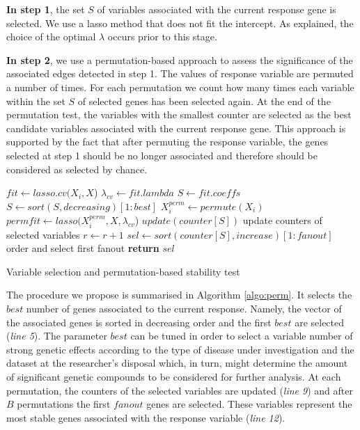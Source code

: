 \textbf{In step 1}, the set $S$ of variables associated with the current response gene is selected. We use a lasso method that does not fit the intercept. As explained, the choice of the optimal $\lambda$ occurs prior to this stage.

\textbf{In step 2}, we use a permutation-based approach to assess the significance of the associated edges detected in step 1. The values of response variable are permuted a number of times. For each permutation we count how many times each variable within the set $S$ of selected genes has been selected again. At the end of the permutation test, the variables with the smallest counter are selected as the best candidate variables associated with the current response gene. 
This approach is supported by the fact that after permuting the response variable, the genes selected at step 1 should be no longer associated and therefore should be considered as selected by chance. 

\begin{algorithm}
 \begin{algorithmic}[1]
 \State $fit \gets lasso.cv(X_i,X$)
 \State $\lambda_{cv} \gets fit.lambda$
 \State $S \gets fit.coeffs$
 \State $S \gets sort(S, decreasing)[1:best] $ 
 \State $X^{perm}_i \gets permute(X_i)$
 \State $permfit \gets lasso(X^{perm}_i, X, \lambda_{cv}$)
 \State $update(counter[S])$  update counters of selected variables 
 \State $r\gets r+1$
 \EndWhile
 \State $sel\gets sort(counter[S], increase)[1:fanout] $ order and select first fanout
 \State \textbf{return} $sel$ 
 \EndProcedure
 \end{algorithmic}
 \caption{Variable selection and permutation-based stability test}
 \label{algo:perm}
\end{algorithm}

The procedure we propose is summarised in Algorithm \ref{algo:perm}. 
It selects the $best$ number of genes associated to the current response. Namely, the vector of the associated genes is sorted in decreasing order and the first $best$ are selected (\emph{line 5}). The parameter $best$ can be tuned in order to select a variable number of strong genetic effects according to the type of disease under investigation and the dataset at the researcher's disposal which, in turn, might determine the amount of significant genetic compounds to be considered for further analysis.   
At each permutation, the counters of the selected variables are updated (\emph{line 9}) and after $B$ permutations the first $fanout$ genes are selected. These variables represent the most stable genes associated with the response variable (\emph{line 12}).

